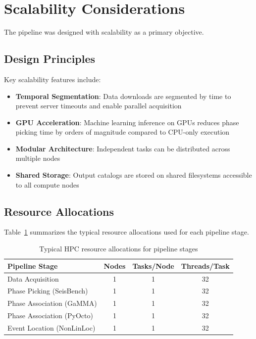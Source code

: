 \section{Scalability Considerations}

The pipeline was designed with scalability as a primary objective.

\subsection{Design Principles}
Key scalability features include:

\begin{itemize}
  \item \textbf{Temporal Segmentation}: Data downloads are segmented by time to
    prevent server timeouts and enable parallel acquisition

  \item \textbf{GPU Acceleration}: Machine learning inference on GPUs reduces
    phase picking time by orders of magnitude compared to CPU-only execution

  \item \textbf{Modular Architecture}: Independent tasks can be distributed
    across multiple nodes

  \item \textbf{Shared Storage}: Output catalogs are stored on shared
    filesystems accessible to all compute nodes
\end{itemize}

\subsection{Resource Allocations}
Table~\ref{tab:hpc_resources} summarizes the typical resource allocations used
for each pipeline stage.

\begin{table}[h]
  \centering
  \caption{Typical HPC resource allocations for pipeline stages}
  \label{tab:hpc_resources}
  \begin{tabular}{lccc}
    \hline
    \textbf{Pipeline Stage} & \textbf{Nodes} & \textbf{Tasks/Node} &
    \textbf{Threads/Task} \\
    \hline
    Data Acquisition & 1 & 1 & 32 \\
    Phase Picking (SeisBench) & 1 & 1 & 32 \\
    Phase Association (GaMMA) & 1 & 1 & 32 \\
    Phase Association (PyOcto) & 1 & 1 & 32 \\
    Event Location (NonLinLoc) & 1 & 1 & 32 \\
    \hline
  \end{tabular}
\end{table}

